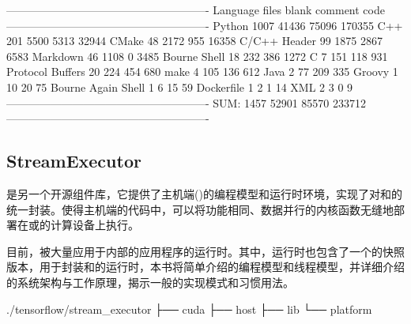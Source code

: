 \begin{content}
\begin{leftbar}
\begin{python}[caption={Contrib代码统计}]
-------------------------------------------------------
Language            files     blank   comment      code
-------------------------------------------------------
Python               1007     41436     75096    170355
C++                   201      5500      5313     32944
CMake                  48      2172       955     16358
C/C++ Header           99      1875      2867      6583
Markdown               46      1108         0      3485
Bourne Shell           18       232       386      1272
C                       7       151       118       931
Protocol Buffers       20       224       454       680
make                    4       105       136       612
Java                    2        77       209       335
Groovy                  1        10        20        75
Bourne Again Shell      1         6        15        59
Dockerfile              1         2         1        14
XML                     2         3         0         9
-------------------------------------------------------
SUM:                 1457     52901     85570    233712
-------------------------------------------------------
\end{python}
\end{leftbar}

\subsection{StreamExecutor}

是另一个开源组件库，它提供了主机端()的编程模型和运行时环境，实现了对和的统一封装。使得主机端的代码中，可以将功能相同、数据并行的内核函数无缝地部署在或的计算设备上执行。

目前，被大量应用于内部的应用程序的运行时。其中，\tf{}运行时也包含了一个的快照版本，用于封装和的运行时，本书将简单介绍的编程模型和线程模型，并详细介绍的系统架构与工作原理，揭示一般的实现模式和习惯用法。

\begin{leftbar}
\begin{c++}[caption={StreamExecutor源码结构}]
./tensorflow/stream_executor
├── cuda
├── host
├── lib
└── platform
\end{c++}
\end{leftbar}


\end{content}
